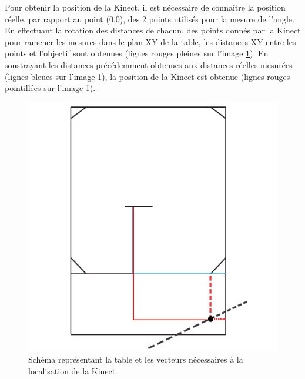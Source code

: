 Pour obtenir la position de la Kinect, il est nécessaire de connaître la position réelle, par rapport au point (0.0), des 2 points utilisés pour la mesure de l'angle. En effectuant la rotation des distances de chacun, des points donnés par la Kinect pour ramener les mesures dans le plan XY de la table, les distances XY entre les points et l'objectif sont obtenues (lignes rouges pleines sur l'image \ref{fig:kinect_position}). En soustrayant les distances précédemment obtenues aux distances réelles mesurées (lignes bleues sur l'image \ref{fig:kinect_position}), la position de la Kinect est obtenue (lignes rouges pointillées sur l'image \ref{fig:kinect_position}).

\begin{figure}[htbp]
\centering
\includegraphics[scale=1]{fig/kinect_position.pdf}
\caption{Schéma représentant la table et les vecteurs nécessaires à la localisation de la Kinect}
\label{fig:kinect_position}
\end{figure}


